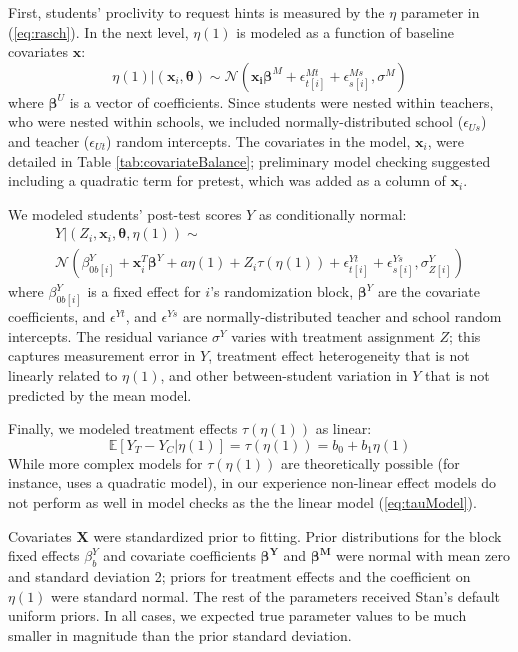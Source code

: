\documentclass{article}
\newcommand{\EE}{\mathbb{E}}
\begin{document}
First, students' proclivity to request hints is measured by the $\eta$
parameter in (\ref{eq:rasch}).
In the next level, $\eta(1)$ is modeled as a function of baseline
covariates $\bm{x}$:
\begin{equation}\label{eq:rasch2}
\eta(1)|\left(\bm{x}_i,\bm{\theta}\right) \sim
\mathcal{N}\left(\bm{x_i}\bm{\beta}^M+\epsilon^{Mt}_{t[i]}+\epsilon^{Ms}_{s[i]},
\sigma^M\right)
\end{equation}
where $\bm{\beta}^U$ is a vector of coefficients.
Since students were nested within teachers, who were nested within
schools, we included normally-distributed school ($\epsilon_{Us}$) and
teacher ($\epsilon_{Ut}$) random intercepts.
The covariates in the model, $\bm{x}_i$, were detailed in Table
\ref{tab:covariateBalance}; preliminary model checking suggested
including a quadratic term for pretest, which was added as a column of
$\bm{x}_i$.

We modeled students' post-test scores $Y$ as
conditionally normal:
\begin{multline}\label{eq:outcomeSubmodel}
 Y|\left(Z_i,\bm{x}_i,\bm{\theta},\eta(1)\right) \sim \\ \mathcal{N}\left(
\beta^Y_{0b[i]}+\bm{x}_i^T\bm{\beta}^Y+a\eta(1)+Z_i\tau(\eta(1))+\epsilon^{Yt}_{t[i]}+\epsilon^{Ys}_{s[i]},\sigma^Y_{Z[i]}\right)
\end{multline}
where $\beta^Y_{0b[i]}$ is a fixed effect for $i$'s randomization block, $\bm{\beta}^Y$ are the
covariate coefficients, and $\epsilon^{Yt}$, and
$\epsilon^{Ys}$ are normally-distributed teacher and school random
intercepts.
The residual variance $\sigma^Y$ varies with treatment assignment $Z$;
this captures measurement error in $Y$, treatment effect heterogeneity
that is not linearly related to
$\eta(1)$, and other between-student variation in $Y$ that is not predicted by
the mean model.

Finally, we modeled treatment effects
$\tau(\eta(1))$ as linear:
\begin{equation}\label{eq:tauModel}
\EE[Y_{T}-Y_{C}|\eta(1)]=\tau({\eta(1)})=b_0+b_1\eta(1)
\end{equation}
While more complex models for $\tau(\eta(1))$ are theoretically
possible (for instance, \citet{jin2008principal} uses a quadratic
model), in our experience non-linear effect models do not perform as
well in model checks as the the linear model (\ref{eq:tauModel}).

Covariates $\bm{X}$ were standardized prior to fitting.
Prior distributions for the block fixed effects $\beta^Y_b$ and covariate coefficients
$\bm{\beta^Y}$ and $\bm{\beta^M}$ were normal with mean zero and
standard deviation 2;
priors for treatment effects and the coefficient on $\eta(1)$ were standard
normal.
The rest of the parameters received Stan's default uniform priors.
In all cases, we expected true parameter values to be much smaller in
magnitude than the prior standard deviation.
\end{document}
